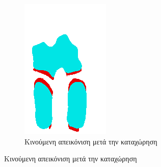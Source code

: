 \documentclass[a4paper,12pt]{article}
\begin{document}
\begin{figure}[H]
\begin{subfigure}[t]{0.4\linewidth}
    \includegraphics[width=\linewidth]{moving_label_before_registration_2.png}
    \caption{Κινούμενη απεικόνιση μετά την καταχώρηση}
    \end{subfigure}


\end{figure}
\end{document}
